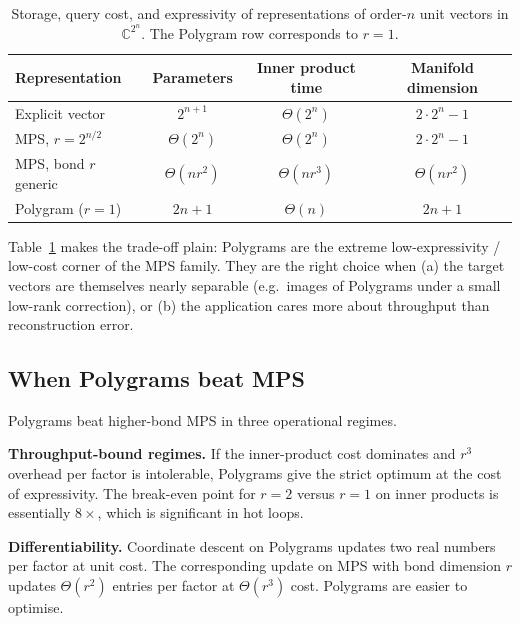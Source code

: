 \documentclass[11pt,letterpaper]{article}
\theoremstyle{definition}
\newcommand{\C}{\mathbb{C}}
\begin{document}
\begin{table}[h]
\centering
\begin{tabular}{lccc}
\toprule
Representation & Parameters & Inner product time & Manifold dimension \\
\midrule
Explicit vector       & $2^{n+1}$        & $\Theta(2^{n})$    & $2 \cdot 2^{n} - 1$ \\
MPS, $r = 2^{n/2}$    & $\Theta(2^{n})$  & $\Theta(2^{n})$    & $2 \cdot 2^{n} - 1$ \\
MPS, bond $r$ generic & $\Theta(n r^{2})$ & $\Theta(n r^{3})$ & $\Theta(n r^{2})$ \\
Polygram ($r = 1$)    & $2n + 1$         & $\Theta(n)$        & $2n + 1$ \\
\bottomrule
\end{tabular}
\caption{Storage, query cost, and expressivity of representations of order-$n$
unit vectors in $\C^{2^{n}}$. The Polygram row corresponds to $r = 1$.}
\label{tab:tradeoff}
\end{table}

Table~\ref{tab:tradeoff} makes the trade-off plain: Polygrams are the
extreme low-expressivity / low-cost corner of the MPS family. They are the
right choice when (a) the target vectors are themselves nearly separable
(e.g.\ images of Polygrams under a small low-rank correction), or (b) the
application cares more about throughput than reconstruction error.

\subsection{When Polygrams beat MPS}

Polygrams beat higher-bond MPS in three operational regimes.

\textbf{Throughput-bound regimes.} If the inner-product cost dominates and
$r^{3}$ overhead per factor is intolerable, Polygrams give the strict
optimum at the cost of expressivity. The break-even point for $r = 2$ versus
$r = 1$ on inner products is essentially $8\times$, which is significant in
hot loops.

\textbf{Differentiability.} Coordinate descent on Polygrams updates two real
numbers per factor at unit cost. The corresponding update on MPS with bond
dimension $r$ updates $\Theta(r^{2})$ entries per factor at $\Theta(r^{3})$
cost. Polygrams are easier to optimise.
\end{document}
